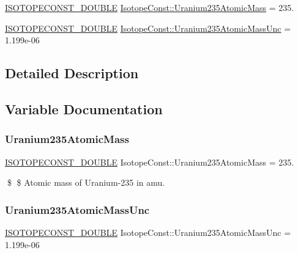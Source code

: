 \begin{DoxyCompactItemize}
\item 
\mbox{\hyperlink{group___isotope_const-_macros_ga8f45a7272ce02c0b4c65c44636ed719a}{I\+S\+O\+T\+O\+P\+E\+C\+O\+N\+S\+T\+\_\+\+D\+O\+U\+B\+LE}} \mbox{\hyperlink{group___isotope_const-_uranium-_u235_gabc5a639d551de1feb6a2231da918c66c}{Isotope\+Const\+::\+Uranium235\+Atomic\+Mass}} = 235.
\item 
\mbox{\hyperlink{group___isotope_const-_macros_ga8f45a7272ce02c0b4c65c44636ed719a}{I\+S\+O\+T\+O\+P\+E\+C\+O\+N\+S\+T\+\_\+\+D\+O\+U\+B\+LE}} \mbox{\hyperlink{group___isotope_const-_uranium-_u235_ga982e9125e3e9f4fde43e39714982525a}{Isotope\+Const\+::\+Uranium235\+Atomic\+Mass\+Unc}} = 1.\+199e-\/06
\end{DoxyCompactItemize}


\subsection{Detailed Description}


\subsection{Variable Documentation}
\mbox{\label{group___isotope_const-_uranium-_u235_gabc5a639d551de1feb6a2231da918c66c}} 
\subsubsection{\texorpdfstring{Uranium235\+Atomic\+Mass}{Uranium235AtomicMass}}
{\footnotesize\ttfamily \mbox{\hyperlink{group___isotope_const-_macros_ga8f45a7272ce02c0b4c65c44636ed719a}{I\+S\+O\+T\+O\+P\+E\+C\+O\+N\+S\+T\+\_\+\+D\+O\+U\+B\+LE}} Isotope\+Const\+::\+Uranium235\+Atomic\+Mass = 235.}

\$ \$ Atomic mass of Uranium-\/235 in amu. \mbox{\label{group___isotope_const-_uranium-_u235_ga982e9125e3e9f4fde43e39714982525a}} 
\subsubsection{\texorpdfstring{Uranium235\+Atomic\+Mass\+Unc}{Uranium235AtomicMassUnc}}
{\footnotesize\ttfamily \mbox{\hyperlink{group___isotope_const-_macros_ga8f45a7272ce02c0b4c65c44636ed719a}{I\+S\+O\+T\+O\+P\+E\+C\+O\+N\+S\+T\+\_\+\+D\+O\+U\+B\+LE}} Isotope\+Const\+::\+Uranium235\+Atomic\+Mass\+Unc = 1.\+199e-\/06}

